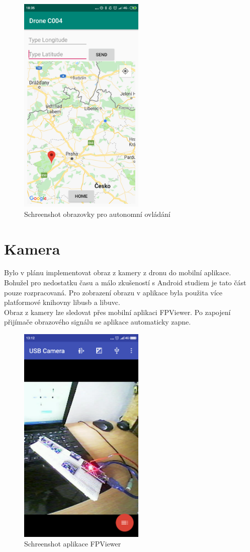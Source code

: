 \begin{figure}[H]
	\centering
	\includegraphics[width=6cm]{pictures/app2.png}
	\caption{Schreenshot obrazovky pro autonomní ovládání}
\end{figure}

\section{Kamera}
Bylo v plánu implementovat obraz z kamery z dronu do mobilní aplikace. Bohužel pro nedostatku času a málo zkušeností s Android studiem je tato část pouze rozpracovaná. Pro zobrazení obrazu v aplikace byla použita více platformové knihovny libusb a libuvc.\\
Obraz z kamery lze sledovat přes mobilní aplikaci FPViewer. Po zapojení přijímače obrazového signálu se aplikace automaticky zapne.\\

\begin{figure}[H]
	\centering
	\includegraphics[width=6cm]{pictures/fpvscreenshot.png}
	\caption{Schreenshot aplikace FPViewer}
\end{figure}

